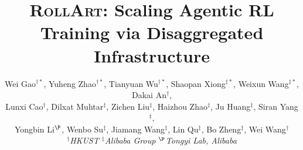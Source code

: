 \newcommand{\cmark}{\ding{51}}%
\newcommand{\xmark}{\ding{55}}%


\theoremstyle{definition}


\newenvironment{denseitemize}{
	\begin{itemize}[topsep=2pt, partopsep=0pt, leftmargin=1.5em] %
		\setlength{\itemsep}{3pt}
		\setlength{\parskip}{0pt}
		\setlength{\parsep}{0pt}
	}{\end{itemize}}


\newcommand{\PHB}[1]{\noindent\textbf{#1}}
\newcommand{\PHM}[1]{\vspace{.4em}\noindent\textbf{#1}} 
 
\newcommand{\SystemName}{\textsc{RollArt}\xspace}

\newcommand{\gw}[1]{\textcolor{blue}{#1}}



\date{}


 \title{\Large \bf \SystemName: Scaling Agentic RL Training via Disaggregated Infrastructure}
 
\author{
    {\rm Wei Gao$^{\dagger*}$, Yuheng Zhao$^{\dagger*}$, Tianyuan Wu$^{\dagger*}$, Shaopan Xiong$^{\ddagger*}$, Weixun Wang$^{\ddagger*}$, Dakai An$^{\dagger}$,} \\
    {\rm Lunxi Cao$^{\dagger}$, Dilxat Muhtar$^{\ddagger}$, Zichen Liu$^{\ddagger}$, Haizhou Zhao$^{\ddagger}$, Ju Huang$^{\ddagger}$, Siran Yang$^{\ddagger}$,} \\
    {\rm Yongbin Li$^{\P}$, Wenbo Su$^{\ddagger}$, Jiamang Wang$^{\ddagger}$, Lin Qu$^{\ddagger}$, Bo Zheng$^{\ddagger}$, Wei Wang$^{\dagger}$}
    \bigskip \\
    {\em $^{\dagger}$HKUST \quad $^{\ddagger}$Alibaba Group \quad $^{\P}$Tongyi Lab, Alibaba}
    \vspace{0.5cm}
}






